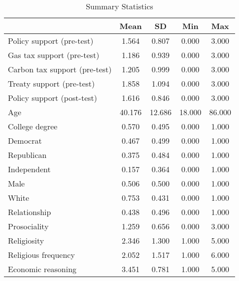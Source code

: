 \begin{table*}

\caption{\label{tab:unnamed-chunk-15}Summary Statistics \label{tab:summary_stats}}
\centering
\begin{tabular}[t]{lcccc}
\toprule
 & Mean & SD & Min & Max\\
\midrule
Policy support (pre-test) & 1.564 & 0.807 & 0.000 & 3.000\\
Gas tax support (pre-test) & 1.186 & 0.939 & 0.000 & 3.000\\
Carbon tax support (pre-test) & 1.205 & 0.999 & 0.000 & 3.000\\
Treaty support (pre-test) & 1.858 & 1.094 & 0.000 & 3.000\\
Policy support (post-test) & 1.616 & 0.846 & 0.000 & 3.000\\
\addlinespace
Age & 40.176 & 12.686 & 18.000 & 86.000\\
College degree & 0.570 & 0.495 & 0.000 & 1.000\\
Democrat & 0.467 & 0.499 & 0.000 & 1.000\\
Republican & 0.375 & 0.484 & 0.000 & 1.000\\
Independent & 0.157 & 0.364 & 0.000 & 1.000\\
\addlinespace
Male & 0.506 & 0.500 & 0.000 & 1.000\\
White & 0.753 & 0.431 & 0.000 & 1.000\\
Relationship & 0.438 & 0.496 & 0.000 & 1.000\\
Prosociality & 1.259 & 0.656 & 0.000 & 3.000\\
Religiosity & 2.346 & 1.300 & 1.000 & 5.000\\
\addlinespace
Religious frequency & 2.052 & 1.517 & 1.000 & 6.000\\
Economic reasoning & 3.451 & 0.781 & 1.000 & 5.000\\
\bottomrule
\end{tabular}
\end{table*}

